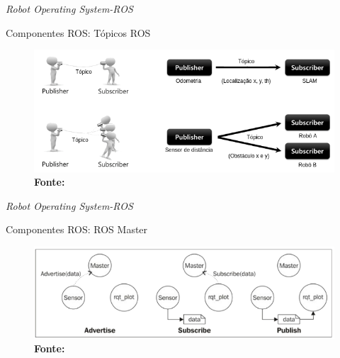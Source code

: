 \documentclass[10pt]{beamer}
\begin{document}
\begin{frame}{\textit{Robot Operating System-ROS}}
	\begin{alertblock}{Componentes ROS: Tópicos ROS}
		\vspace{0.1cm}
		\begin{figure}[h]
			\begin{center}
				\includegraphics[scale=0.43]{imagens/rostopic.png}\\
				{\footnotesize \textbf{Fonte:}}
			\end{center}
			\label{fig:topico}
		\end{figure}
	\end{alertblock}
\end{frame}

\begin{frame}{\textit{Robot Operating System-ROS}}
	\begin{alertblock}{Componentes ROS: ROS Master}
		\vspace{0.7cm}
		\begin{figure}[h]
			\begin{center}
				\includegraphics[scale=0.43]{imagens/rosmaster.png}\\
				{\footnotesize \textbf{Fonte:}}
			\end{center}
			\label{fig:master}
		\end{figure}
	\end{alertblock}
\end{frame}
\end{document}
